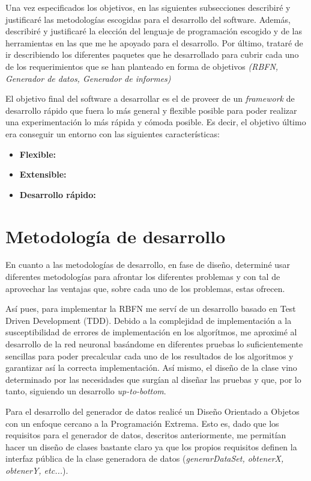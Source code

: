 \documentclass[10pt,a4paper]{report}
\begin{document}
Una vez especificados los objetivos, en las siguientes subsecciones describiré y justificaré las metodologías escogidas para el desarrollo del software. Además, describiré y justificaré la elección del lenguaje de programación escogido y de las herramientas en las que me he apoyado para el desarrollo. Por último, trataré de ir describiendo los diferentes paquetes que he desarrollado para cubrir cada uno de los requerimientos que se han planteado en forma de objetivos \textit{(RBFN, Generador de datos, Generador de informes)}

El objetivo final del software a desarrollar es el de proveer de un \textit{framework} de desarrollo rápido que fuera lo más general y flexible posible para poder realizar una experimentación lo más rápida y cómoda posible. Es decir, el objetivo último era conseguir un entorno con las siguientes características:
\begin{itemize}
	\item \textbf{Flexible:} 
	\item \textbf{Extensible:}
	\item \textbf{Desarrollo rápido:}
\end{itemize}


\section{Metodología de desarrollo}
En cuanto a las metodologías de desarrollo, en fase de diseño, determiné usar diferentes metodologías para afrontar los diferentes problemas y con tal de aprovechar las ventajas que, sobre cada uno de los problemas, estas ofrecen.

Así pues, para implementar la RBFN me serví de un desarrollo basado en Test Driven Development (TDD). Debido a la complejidad de implementación a la susceptibilidad de errores de implementación en los algorítmos, me aproximé al desarrollo de la red neuronal basándome en diferentes pruebas lo suficientemente sencillas para poder precalcular cada uno de los resultados de los algoritmos y garantizar así la correcta implementación. Así mismo, el diseño de la clase vino determinado por las necesidades que surgían al diseñar las pruebas y que, por lo tanto, siguiendo un desarrollo \textit{up-to-bottom}.

Para el desarrollo del generador de datos realicé un Diseño Orientado a Objetos con un enfoque cercano a la Programación Extrema. Esto es, dado que los requisitos para el generador de datos, descritos anteriormente, me permitían hacer un diseño de clases bastante claro ya que los propios requisitos definen la interfaz pública de la clase generadora de datos (\textit{generarDataSet, obtenerX, obtenerY, etc...}).
\end{document}
